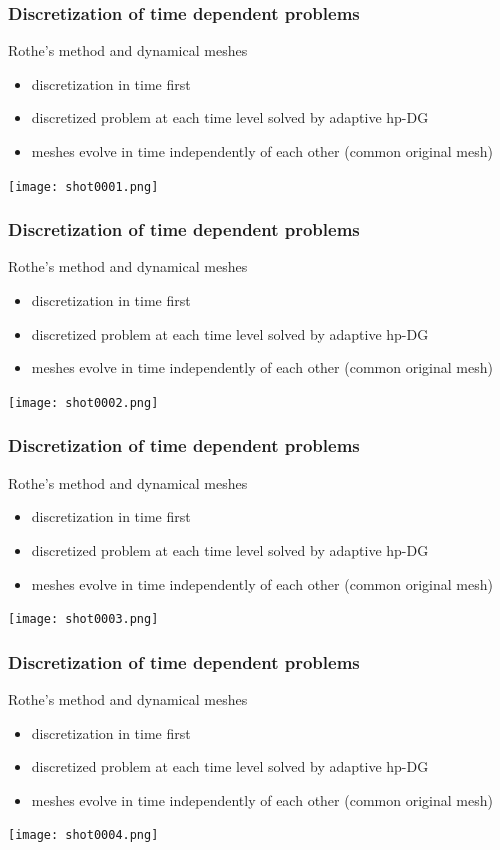 \documentclass{beamer}
\begin{document}
\begin{frame}
\frametitle{Discretization of time dependent problems}
Rothe's method and dynamical meshes
\begin{itemize}
\item discretization in time first
\item discretized problem at each time level solved by adaptive hp-DG
\item meshes evolve in time independently of each other (common original mesh)
\end{itemize}
\begin{center}
\texttt{[image: shot0001.png]}
\end{center}
\end{frame}
\begin{frame}
\frametitle{Discretization of time dependent problems}
Rothe's method and dynamical meshes
\begin{itemize}
\item discretization in time first
\item discretized problem at each time level solved by adaptive hp-DG
\item meshes evolve in time independently of each other (common original mesh)
\end{itemize}
\begin{center}
\texttt{[image: shot0002.png]}
\end{center}
\end{frame}%
\begin{frame}
\frametitle{Discretization of time dependent problems}
Rothe's method and dynamical meshes
\begin{itemize}
\item discretization in time first
\item discretized problem at each time level solved by adaptive hp-DG
\item meshes evolve in time independently of each other (common original mesh)
\end{itemize}
\begin{center}
\texttt{[image: shot0003.png]}
\end{center}
\end{frame}%
\begin{frame}
\frametitle{Discretization of time dependent problems}
Rothe's method and dynamical meshes
\begin{itemize}
\item discretization in time first
\item discretized problem at each time level solved by adaptive hp-DG
\item meshes evolve in time independently of each other (common original mesh)
\end{itemize}
\begin{center}
\texttt{[image: shot0004.png]}
\end{center}
\end{frame}
\end{document}
